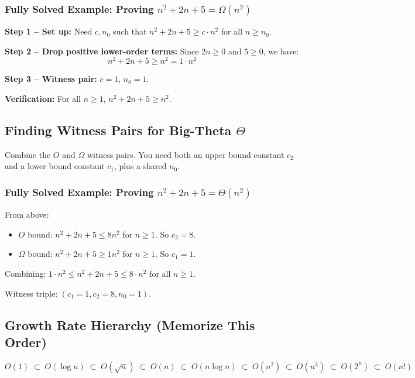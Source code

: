 \documentclass[12pt,portrait]{article}
\begin{document}
\subsubsection{Fully Solved Example: Proving $n^2 + 2n + 5 = \Omega(n^2)$}

\begin{rulebox}
\textbf{Step 1 -- Set up:} Need $c, n_0$ such that $n^2 + 2n + 5 \geq c \cdot n^2$ for all $n \geq n_0$.

\textbf{Step 2 -- Drop positive lower-order terms:} Since $2n \geq 0$ and $5 \geq 0$, we have:
$$n^2 + 2n + 5 \geq n^2 = 1 \cdot n^2$$

\textbf{Step 3 -- Witness pair:} $c = 1$, $n_0 = 1$.

\textbf{Verification:} For all $n \geq 1$, $n^2 + 2n + 5 \geq n^2$.
\end{rulebox}

\subsection{Finding Witness Pairs for Big-Theta $\Theta$}

Combine the $O$ and $\Omega$ witness pairs. You need both an upper bound constant $c_2$ and a lower bound constant $c_1$, plus a shared $n_0$.

\subsubsection{Fully Solved Example: Proving $n^2 + 2n + 5 = \Theta(n^2)$}

\begin{rulebox}
From above:
\begin{itemize}[leftmargin=*]
    \item $O$ bound: $n^2 + 2n + 5 \leq 8n^2$ for $n \geq 1$. So $c_2 = 8$.
    \item $\Omega$ bound: $n^2 + 2n + 5 \geq 1n^2$ for $n \geq 1$. So $c_1 = 1$.
\end{itemize}
Combining: $1\cdot n^2 \leq n^2 + 2n + 5 \leq 8\cdot n^2$ for all $n \geq 1$.

Witness triple: $(c_1=1, c_2=8, n_0=1)$.
\end{rulebox}

\subsection{Growth Rate Hierarchy (Memorize This Order)}
\begin{center}
\begin{tcolorbox}[colback=yellow!10!white,colframe=yellow!50!black,title=Slowest $\to$ Fastest]
$$O(1) \;\subset\; O(\log n) \;\subset\; O(\sqrt{n}) \;\subset\; O(n) \;\subset\; O(n\log n) \;\subset\; O(n^2) \;\subset\; O(n^3) \;\subset\; O(2^n) \;\subset\; O(n!)$$
\end{tcolorbox}
\end{center}
\end{document}
